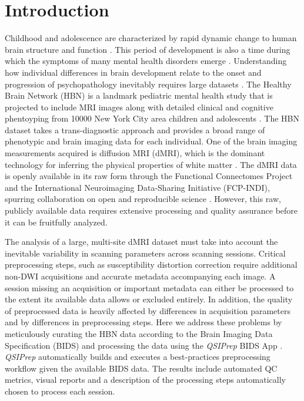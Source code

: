 \documentclass[9pt,lineno]{elife}
\begin{document}
\section{Introduction}

Childhood and adolescence are characterized by rapid dynamic change to human brain
structure and function \citep{Lebel2018-oy}. This period of development is also a time during which the
symptoms of many mental health disorders emerge \citep{Paus2008-gi}.
Understanding how individual differences in brain development relate to the onset and progression of psychopathology inevitably requires large datasets  \citep{Paus2010-qk, Fair2021-eg}.
The Healthy Brain Network (HBN) is a landmark pediatric mental health study
that is projected to include MRI images along with detailed clinical and cognitive phentoyping from \num{10000} New York
City area children and adolescents \citep{alexander2017-yc}. The HBN dataset
takes a trans-diagnostic approach and provides a broad range of phenotypic and brain
imaging data for each individual. One of the brain imaging measurements acquired 
is diffusion MRI (dMRI), which is the dominant technology for inferring the
physical properties of white matter \citep{wandell2016-qt}. The dMRI
data is openly available in its raw form through the Functional Connectomes
Project and the International Neuroimaging Data-Sharing Initiative (FCP-INDI),
spurring collaboration on open and reproducible science
\citep{Mennes2013-dl, avesani2019-ey}. However, this raw, publicly available data requires extensive processing and quality assurance before it can be fruitfully analyzed.

The analysis of a large, multi-site dMRI dataset must take into account the inevitable variability
in scanning parameters across scanning sessions.
Critical preprocessing steps, such as susceptibility 
distortion correction \citep{jones2010-ps} require additional non-DWI acquisitions and accurate metadata accompanying each
image.
A session missing an acquisition or important metadata can either be processed to the extent 
its available data allows or excluded entirely.
In addition, the quality of preprocessed data is heavily affected by 
differences in acquisition parameters \citep{yeh2019-kb} and by differences in preprocessing
steps.
Here we address these problems by meticulously curating
the HBN data according to the Brain Imaging Data Specification (BIDS)
\citep{gorgolewski2016-lh} and processing the data using the \emph{QSIPrep} \citep{cieslak2021-iq} 
BIDS App \citep{Gorgolewski2017-mb}. \emph{QSIPrep} automatically builds and executes a 
best-practices preprocessing workflow given the available BIDS data. The results include automated
QC metrics, visual reports and a description of the processing steps automatically chosen to process
each session.
\end{document}
